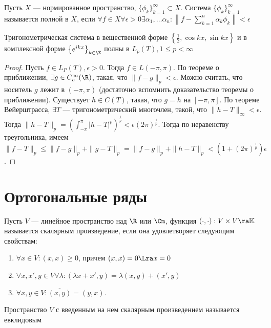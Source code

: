 \begin{definition}
    Пусть \(X\) --- нормированное пространство, \(\{\phi_k\}_{k = 1}^\infty \subset X\). Система \(\{\phi_k\}_{k = 1}^\infty\) называется полной в \(X\), если \(\forall f \in X \forall \epsilon > 0 \exists\alpha_1, \dots \alpha_n: \left\| f - \sum_{k = 1}^n \alpha_k\phi_k \right\| < \epsilon\)
\end{definition}

\begin{theorem}
    Тригонометрическая система в вещественной форме \(\left\{ \frac{1}{2}, \cos kx, \sin kx \right\}\) и в комплексной форме \(\left\{ e^{ikx} \right\}_{k \in \Z}\) полны в \(L_p(T), 1 \le p < \infty\)
\end{theorem}
\begin{proof}
    Пусть \(f \in L_P(T), \epsilon > 0\). Тогда \(f \in L(-\pi, \pi)\). По теореме о приближении, \(\exists g \in C_c^\infty(\R)\), такая, что \(\|f - g\|_p < \epsilon\). Можно считать, что носитель \(g\) лежит в \((-\pi, \pi)\) (достаточно вспомнить доказательство теоремы о приближении). Существует \(h \in C(T)\), такая, что \(g = h\) на \([-\pi, \pi]\). По теореме Вейерштрасса, \(\exists T\) --- тригонометрический многочлен, такой, что \(\|h - T\|_\infty < \epsilon\). Тогда \(\|h - T\|_p = \left( \int_{-\pi}^\pi |h - T|^p \right)^{\frac{1}{p}} < \epsilon (2\pi)^{\frac{1}{p}}\). Тогда по неравенству треугольника, имеем \(\|f - T\|_p \le \|f - g\|_p + \|g - T\|_p = \|f - g\|_p + \|h - T\|_p < (1 + (2\pi)^{\frac{1}{p}})\epsilon\).
\end{proof}

\section{Ортогональные ряды}

\begin{definition}
    Пусть \(V\) --- линейное пространство над \(\R\) или \(\Cm\), функция \((\cdot, \cdot): V \times V \ra \mathbb{K}\) называется скалярным произведение, если она удовлетворяет следующим свойствам:
    \begin{enumerate}
        \item \(\forall x \in V: (x, x) \ge 0\), причем \((x, x) = 0 \Lra x = 0\)
        \item \(\forall x, x', y \in V \forall \lambda: (\lambda x + x', y) = \lambda(x, y) + (x', y)\)
        \item \(\forall x, y \in V: \overline{(x, y)} = (y, x)\).
    \end{enumerate}
    Пространство \(V\) с введенным на нем скалярным произведением называется евклидовым
\end{definition}

